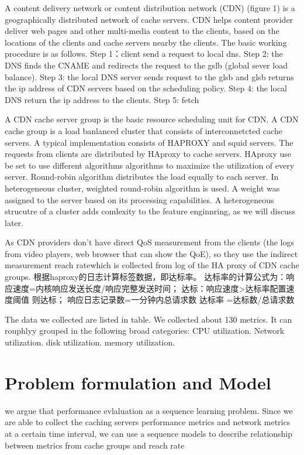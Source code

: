 \documentclass[5p]{elsarticle}
\newcommand{\dabiaolv}{reach rate}
\begin{document}
A content delivery network or content distribution network (CDN) (figure 1) is a geographically distributed network of cache servers. CDN helps content provider deliver web pages and other multi-media content to the clients, based on the locations of the clients and cache servers nearby the clients. The basic working procedure is as follows. Step 1：client send a request to local dns. Step 2: the DNS finds the CNAME and redirects the request to the gslb (global sever load balance). Step 3: the local DNS server sends request to the glsb and glsb returns the ip address of CDN servers based on the scheduling policy. Step 4: the local DNS return the ip address to the clients. Step 5: fetch


A CDN cache server group is the basic resource scheduling unit for CDN. A CDN cache group is a load banlanced cluster that consists of interconnetcted cache servers. A typical implementation consists of HAPROXY and squid servers. The requests from clients are distributed by HAproxy to cache servers. HAproxy use be set to use different algorithms algorithms to maximize the utilization of every server. Round-robin algorithm distributes the load equally to each server. In heterogeneous cluster,  weighted round-robin algorithm is used. A weight was assigned to the server based on its processing capabilities. A heterogeneous strucutre of a cluster adds comlexity to the feature enginnring, as we will discuss later.

As CDN providers don't have direct QoS measurement from the clients (the logs from video players, web browser that can show the QoE), so they use the indirect measurement \dabiaolv which is collected from log of the HA proxy of CDN cache groups. 
根据haproxy的日志计算标签数据，即达标率。
达标率的计算公式为：响应速度=内核响应发送长度/响应完整发送时间；
达标：响应速度>达标率配置速度阈值 则达标；
响应日志记录数=一分钟内总请求数
达标率 =达标数/总请求数

The data we collected are listed in table. We collected about 130 metrics. It can rouphlyy grouped in the following broad categories: CPU utilization. Network utilization. disk utilization. memory utilization.
\section{Problem formulation and Model}


we argue that performance evlaluation as a sequence learning problem. Since we are able to collect the caching servers performance metrics and network metrics at a certain time interval, we can use a sequence models to describe relationship between metrics from  cache groups and \dabiaolv
\end{document}
